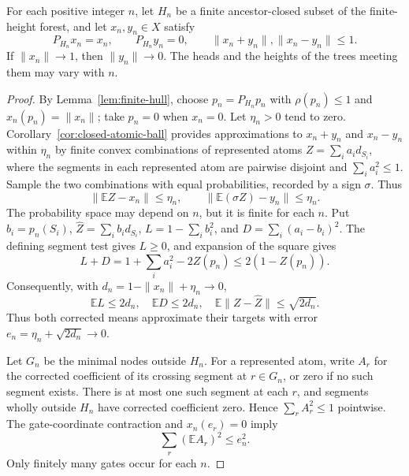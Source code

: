 \begin{lemma}\label{mola:sequential}
For each positive integer $n$, let $H_n$ be a finite ancestor-closed
subset of the finite-height forest, and let $x_n,y_n\in X$ satisfy
\[
 P_{H_n}x_n=x_n,\qquad P_{H_n}y_n=0,\qquad
 \|x_n+y_n\|,\|x_n-y_n\|\le1.
\]
If $\|x_n\|\longrightarrow1$, then $\|y_n\|\longrightarrow0$.
The heads and the heights of the trees meeting them may vary with $n$.
\end{lemma}
\begin{proof}
By Lemma~\ref{lem:finite-hull}, choose $p_n=P_{H_n}p_n$ with
$\rho(p_n)\le1$ and $x_n(p_n)=\|x_n\|$; take $p_n=0$ when $x_n=0$.
Let $\eta_n>0$ tend to zero.  Corollary~\ref{cor:closed-atomic-ball}
provides approximations to $x_n+y_n$ and $x_n-y_n$ within $\eta_n$
by finite convex combinations of represented atoms
$Z=\sum_i a_i d_{S_i}$, where the segments in each represented atom
are pairwise disjoint and $\sum_i a_i^2\le1$.  Sample the two
combinations with equal probabilities, recorded by a sign $\sigma$.
Thus
\[
 \|\mathbb EZ-x_n\|\le\eta_n,\qquad
 \|\mathbb E(\sigma Z)-y_n\|\le\eta_n.
\]
The probability space may depend on $n$, but it is finite for each $n$.
Put $b_i=p_n(S_i)$, $\widehat Z=\sum_i b_i d_{S_i}$,
$L=1-\sum_i b_i^2$, and $D=\sum_i(a_i-b_i)^2$.  The defining segment
test gives $L\ge0$, and expansion of the square gives
\[
 L+D=1+\sum_i a_i^2-2Z(p_n)\le2(1-Z(p_n)).
\]
Consequently, with $d_n=1-\|x_n\|+\eta_n\longrightarrow0$,
\[
 \mathbb EL\le2d_n,\quad \mathbb ED\le2d_n,\quad
 \mathbb E\|Z-\widehat Z\|\le\sqrt{2d_n}.
\]
Thus both corrected means approximate their targets with error $e_n=\eta_n+\sqrt{2d_n}\longrightarrow0$.

Let $G_n$ be the minimal nodes outside $H_n$.  For a represented atom,
write $A_r$ for the corrected coefficient of its crossing segment at
$r\in G_n$, or zero if no such segment exists.  There is at most one
such segment at each $r$, and segments wholly outside $H_n$ have
corrected coefficient zero.  Hence $\sum_r A_r^2\le1$ pointwise.
The gate-coordinate contraction and $x_n(e_r)=0$ imply
\[
 \sum_r(\mathbb EA_r)^2\le e_n^2.
\]
Only finitely many gates occur for each $n$.


\end{proof}
